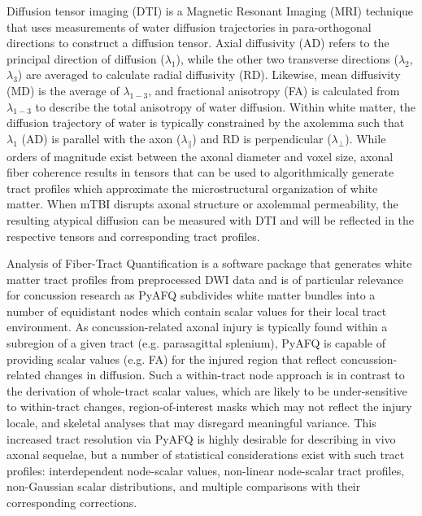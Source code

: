 \documentclass[12pt]{article}
\begin{document}
Diffusion tensor imaging (DTI) is a Magnetic Resonant Imaging (MRI) technique that uses measurements of water diffusion trajectories in para-orthogonal directions to construct a diffusion tensor. Axial diffusivity (AD) refers to the principal direction of diffusion ($\lambda_1$), while the other two transverse directions ($\lambda_2$, $\lambda_3$) are averaged to calculate radial diffusivity (RD). Likewise, mean diffusivity (MD) is the average of $\lambda_{1-3}$, and fractional anisotropy (FA) is calculated from $\lambda_{1-3}$ to describe the total anisotropy of water diffusion. Within white matter, the diffusion trajectory of water is typically constrained by the axolemma such that $\lambda_1$ (AD) is parallel with the axon ($\lambda_\parallel$) and RD is perpendicular ($\lambda_\perp$). While orders of magnitude exist between the axonal diameter and voxel size, axonal fiber coherence results in tensors that can be used to algorithmically generate tract profiles which approximate the microstructural organization of white matter. When mTBI disrupts axonal structure or axolemmal permeability, the resulting atypical diffusion can be measured with DTI and will be reflected in the respective tensors and corresponding tract profiles.

Analysis of Fiber-Tract Quantification \parencite[PyAFQ;][]{yeatman2012TractProfilesWhite,kruper2021EvaluatingReliabilityHuman,kruper2024TractometryHumanConnectome} is a software package that generates white matter tract profiles from preprocessed DWI data and is of particular relevance for concussion research as PyAFQ subdivides white matter bundles into a number of equidistant nodes which contain scalar values for their local tract environment. As concussion-related axonal injury is typically found within a subregion of a given tract (e.g. parasagittal splenium), PyAFQ is capable of providing scalar values (e.g. FA) for the injured region that reflect concussion-related changes in diffusion. Such a within-tract node approach is in contrast to the derivation of whole-tract scalar values, which are likely to be under-sensitive to within-tract changes, region-of-interest masks which may not reflect the injury locale, and skeletal analyses that may disregard meaningful variance. This increased tract resolution via PyAFQ is highly desirable for describing in vivo axonal sequelae, but a number of statistical considerations exist with such tract profiles: interdependent node-scalar values, non-linear node-scalar tract profiles, non-Gaussian scalar distributions, and multiple comparisons with their corresponding corrections.
\end{document}
